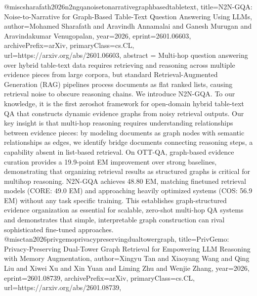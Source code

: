 {}@misc{sharafath2026n2ngqanoisetonarrativegraphbasedtabletext,
      title={N2N-GQA: Noise-to-Narrative for Graph-Based Table-Text Question Answering Using LLMs}, 
      author={Mohamed Sharafath and Aravindh Annamalai and Ganesh Murugan and Aravindakumar Venugopalan},
      year={2026},
      eprint={2601.06603},
      archivePrefix={arXiv},
      primaryClass={cs.CL},
      url={https://arxiv.org/abs/2601.06603},
      abstract = {Multi-hop question answering over hybrid table-text data requires retrieving and reasoning across multiple evidence pieces from large corpora, but standard Retrieval-Augmented Generation (RAG) pipelines process documents as flat ranked lists, causing retrieval noise to obscure reasoning chains. We introduce N2N-GQA. To our knowledge, it is the first zeroshot framework for open-domain hybrid table-text QA that constructs dynamic evidence graphs from noisy retrieval outputs. Our key insight is that multi-hop reasoning requires understanding relationships between evidence pieces: by modeling documents as graph nodes with semantic relationships as edges, we identify bridge documents connecting reasoning steps, a capability absent in list-based retrieval. On OTT-QA, graph-based evidence curation provides a 19.9-point EM improvement over strong baselines, demonstrating that organizing retrieval results as structured graphs is critical for multihop reasoning. N2N-GQA achieves 48.80 EM, matching finetuned retrieval models (CORE: 49.0 EM) and approaching heavily optimized systems (COS: 56.9 EM) without any task specific training. This establishes graph-structured evidence organization as essential for scalable, zero-shot multi-hop QA systems and demonstrates that simple, interpretable graph construction can rival sophisticated fine-tuned approaches.}
}@misc{tan2026privgemoprivacypreservingdualtowergraph,
      title={PrivGemo: Privacy-Preserving Dual-Tower Graph Retrieval for Empowering LLM Reasoning with Memory Augmentation}, 
      author={Xingyu Tan and Xiaoyang Wang and Qing Liu and Xiwei Xu and Xin Yuan and Liming Zhu and Wenjie Zhang},
      year={2026},
      eprint={2601.08739},
      archivePrefix={arXiv},
      primaryClass={cs.CL},
      url={https://arxiv.org/abs/2601.08739},
}
